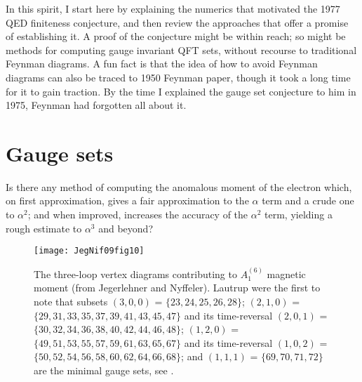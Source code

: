 In this spirit, I start here by explaining the numerics that motivated
the 1977 QED finiteness conjecture, and then review the approaches that
offer a promise of establishing it. A proof of the conjecture might be
within reach; so might be methods for computing gauge invariant QFT sets,
without recourse to traditional Feynman diagrams.
A fun fact is that the idea of how to avoid Feynman diagrams can also be
traced to 1950 Feynman paper, though it took a long time for
it to gain traction. By the time I explained the gauge set conjecture to
him in 1975, Feynman had forgotten all about it.

\bigskip{}

\section{Gauge sets}
\label{sect:finitness}

\begin{bartlett}{
Is there any method of computing the anomalous moment of the
electron which, on first approximation, gives a fair approximation to the
$\alpha$ term and a crude one to $\alpha^2$; and when improved, increases
the accuracy of the $\alpha^2$ term, yielding a rough estimate to
$\alpha^3$ and beyond?
        }
\end{bartlett}

\bigskip

\begin{figure}
\begin{center}
\texttt{[image: JegNif09fig10]}
\end{center}
\caption{\label{JegNif09fig10}
The three-loop vertex diagrams contributing to $A^{(6)}_1$
magnetic moment
(from Jegerlehner and Nyffeler).
Lautrup \etal{} were the first to note that
subsets
$(3,0,0)$ = $\{23,24,25,26,28\}$;
$(2,1,0)$ = $\{29,31,33,35,37,39,41,43,45,47\}$ and its time-reversal
$(2,0,1)$ = $\{30,32,34,36,38,40,42,44,46,48\}$;
$(1,2,0)$ = $\{49,51,53,55,57,59,61,63,65,67\}$ and its time-reversal
$(1,0,2)$ = $\{50,52,54,56,58,60,62,64,66,68\}$;
and
$(1,1,1)$ = $\{69,70,71,72\}$
are the minimal gauge sets, see .
}
 \end{figure}

